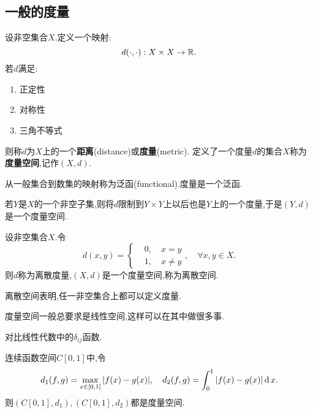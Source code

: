 \subsection{一般的度量}

\begin{axiom}[度量]%
    设非空集合$X$.定义一个映射:
    \[d(\cdot,\cdot):X\times X\to\mathbb{R}.\]
    若$d$满足:
    \begin{enumerate}
        \item 正定性
        \item 对称性
        \item 三角不等式
    \end{enumerate}
    则称$d$为$X$上的一个\textbf{距离}(distance)或\textbf{度量}(metric).
    定义了一个度量$d$的集合$X$称为\textbf{度量空间},记作$(X,d)$.
\end{axiom}

\begin{remark}
    从一般集合到数集的映射称为泛函(functional).度量是一个泛函.
\end{remark}

\begin{remark}
    若$Y$是$X$的一个非空子集,则将$d$限制到$Y\times Y$上以后也是$Y$上的一个度量,于是$(Y,d)$是一个度量空间.
\end{remark}

\begin{example}
    [离散度量]%
    设非空集合$X$.令
    \[d(x,y)=
    \begin{cases}
        &0,\quad x=y\\
        &1,\quad x\ne y
    \end{cases},\quad\forall x,y\in X.\]
    则$d$称为离散度量,$(X,d)$是一个度量空间,称为离散空间.
\end{example}

\begin{remark}
    离散空间表明,任一非空集合上都可以定义度量.
\end{remark}

\begin{remark}
    度量空间一般总要求是线性空间,这样可以在其中做很多事.
\end{remark}

\begin{remark}
    对比线性代数中的$\delta_{ij}$函数.
\end{remark}

\begin{example}%
    连续函数空间$C[0,1]$中,令
    \[d_1(f,g)=\max_{x\in [0,1]}|f(x)-g(x)|,\quad d_2(f,g)=\int_0^1|f(x)-g(x)|\operatorname{d} x.\]
    则$(C[0,1],d_1),(C[0,1],d_2)$都是度量空间.
\end{example}

